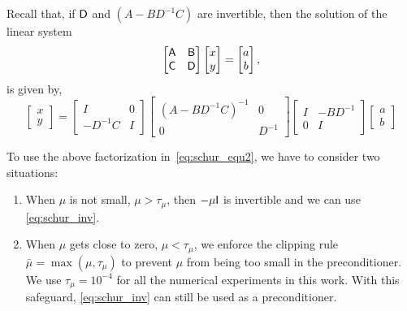 Recall that, if $\mathsf{D}$ and $\left( A-BD^{-1}C \right) $ are invertible,  
then the solution of the linear system 
\begin{equation*}
\begin{bmatrix}
\mathsf{A}  & \mathsf{B} \\
\mathsf{C}  & \mathsf{D} 
\end{bmatrix} 
\begin{bmatrix}
x \\ y
\end{bmatrix}
= 
\begin{bmatrix}
a \\ b
\end{bmatrix}, 
\end{equation*}
is given by, 
\begin{equation}\label{eq:schur_inv}
\begin{bmatrix}
x \\ y
\end{bmatrix}=
\begin{bmatrix}
I  & 0 \\
-D^{-1}C  & I 
\end{bmatrix}
 \begin{bmatrix}
\left( A-BD^{-1}C \right)^{-1}   &  0 \\
 0   & D^{-1} 
\end{bmatrix}
\begin{bmatrix}
I  &   -BD^{-1} \\
0  &  I 
\end{bmatrix}
\begin{bmatrix}
a \\ b
\end{bmatrix}
\end{equation}


To use the above factorization in~\eqref{eq:schur_equ2}, we have to consider two situations: 
\begin{enumerate}
\item When $\mu$ is not small, \eg $\mu > \tau_{\mu}$, then $- \mu \mathsf{I}$ is invertible and we can use \eqref{eq:schur_inv}.   %
\item When $\mu$ gets close to zero, \eg $\mu < \tau_{\mu}$, we enforce the clipping rule 
$ \bar{\mu} = \max(\mu, \tau_\mu) $ 
to prevent $\mu$ from being too small in the preconditioner. We use $\tau_{\mu} = 10^{-4}$ for all the numerical experiments in this work. With this safeguard,  \eqref{eq:schur_inv} can still be used as a preconditioner.
\end{enumerate}

